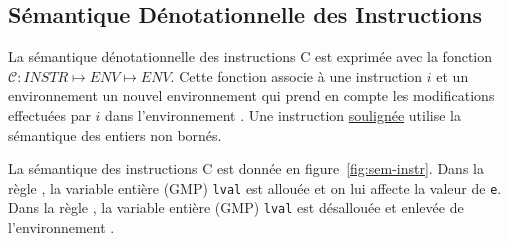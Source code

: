 \subsection{Sémantique Dénotationnelle des Instructions}

La sémantique dénotationnelle des instructions C est exprimée avec la fonction
$\mathcal{C} : INSTR \mapsto ENV \mapsto ENV$.
Cette fonction associe à une instruction $i$ et un environnement \env un nouvel
environnement qui prend en compte les modifications effectuées par $i$ dans
l'environnement \env.
Une instruction \underline{soulignée} utilise la sémantique des entiers non
bornés.

La sémantique des instructions C est donnée en figure~\ref{fig:sem-instr}.
Dans la règle , la variable entière (GMP) \lstinline'lval' est
allouée et on lui affecte la valeur de \lstinline'e'.
Dans la règle , la variable entière (GMP) \lstinline'lval'
est désallouée et enlevée de l'environnement \env.


